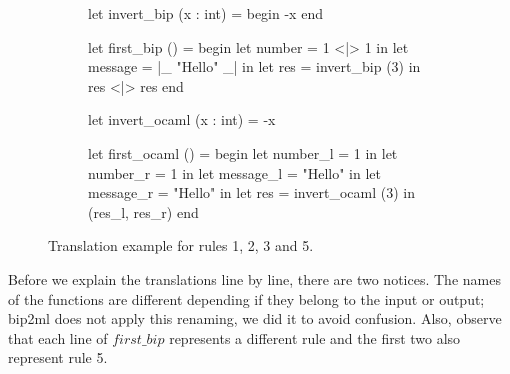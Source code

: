 \begin{figure}[h]
  \centering

  \begin{subfigure}[t]{0.49\textwidth}
    \centering
    \noindent
    \begin{biplangenv}


let invert_bip (x : int) = begin
  -x
end

let first_bip () = begin
  let number = 1 <|> 1 in
  let message = |_ "Hello" _| in
  let res = invert_bip (3) in
  res <|> res
end
    \end{biplangenv}
  \end{subfigure}
  \hfill
  \begin{subfigure}[t]{0.49\textwidth}
    \centering
    \noindent
    \begin{gospel}


let invert_ocaml (x : int) =
  -x

let first_ocaml () = begin
  let number_l = 1 in
  let number_r = 1 in
  let message_l = "Hello" in
  let message_r = "Hello" in
  let res = invert_ocaml (3) in
  (res_l, res_r)
end
    \end{gospel}
  \end{subfigure}
  \caption{Translation example for rules 1, 2, 3 and 5.}
  \label{fig:trans_ex_first}
\end{figure}

Before we explain the translations line by line, there are two notices.
The names of the functions are different depending if they belong to the input or output; bip2ml does not apply this renaming, we did it to avoid confusion.
Also, observe that each line of $first\_bip$ represents a different rule and the first two also represent rule 5.


